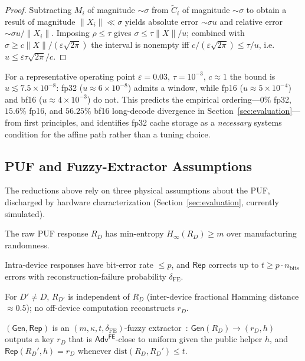 \begin{proof}
Subtracting $M_i$ of magnitude $\sim\sigma$ from $\tilde C_i$ of magnitude
$\sim\sigma$ to obtain a result of magnitude $\lVert X_i\rVert\ll\sigma$ yields
absolute error $\sim\sigma u$ and relative error $\sim\sigma u/\lVert X_i\rVert$.
Imposing $\rho\le\tau$ gives $\sigma\le\tau\lVert X\rVert/u$; combined with
$\sigma\ge c\lVert X\rVert/(\varepsilon\sqrt{2\pi})$ the interval is nonempty iff
$c/(\varepsilon\sqrt{2\pi})\le\tau/u$, i.e.\ $u\le\varepsilon\tau\sqrt{2\pi}/c$.
\end{proof}

For a representative operating point $\varepsilon=0.03$, $\tau=10^{-3}$, $c\approx1$
the bound is $u\lesssim7.5\times10^{-8}$: fp32 ($u\approx6\times10^{-8}$) admits a
window, while fp16 ($u\approx5\times10^{-4}$) and bf16 ($u\approx4\times10^{-3}$) do
not. This predicts the empirical ordering---$0\%$ fp32, $15.6\%$ fp16, and
$56.25\%$ bf16 long-decode divergence in Section~\ref{sec:evaluation}---from first
principles, and identifies fp32 cache storage as a \emph{necessary} systems
condition for the affine path rather than a tuning choice.

\subsection{PUF and Fuzzy-Extractor Assumptions}
\label{sec:theory-puf}

The reductions above rely on three physical assumptions about the PUF, discharged
by hardware characterization (Section~\ref{sec:evaluation}, currently simulated).

\begin{assumption}[Entropy]
\label{ass:entropy}
The raw PUF response $R_D$ has min-entropy $H_\infty(R_D)\ge m$ over manufacturing
randomness.
\end{assumption}
\begin{assumption}[Reliability]
\label{ass:reliable}
Intra-device responses have bit-error rate $\le p$, and $\mathsf{Rep}$ corrects up
to $t\ge p\cdot n_{\mathrm{bits}}$ errors with reconstruction-failure probability
$\delta_{\mathrm{FE}}$.
\end{assumption}
\begin{assumption}
\label{ass:unclonable}
For $D'\neq D$, $R_{D'}$ is independent of $R_D$ (inter-device fractional Hamming
distance $\approx 0.5$); no off-device computation reconstructs $r_D$.
\end{assumption}
\begin{assumption}
\label{ass:fe}
$(\mathsf{Gen},\mathsf{Rep})$ is an $(m,\kappa,t,\delta_{\mathrm{FE}})$-fuzzy
extractor~\cite{dodis_fuzzy}: $\mathsf{Gen}(R_D)\to(r_D,h)$ outputs a key $r_D$ that
is $\mathsf{Adv}^{\mathsf{FE}}$-close to uniform given the public helper $h$, and
$\mathsf{Rep}(R_D',h)=r_D$ whenever $\mathrm{dist}(R_D,R_D')\le t$.
\end{assumption}


